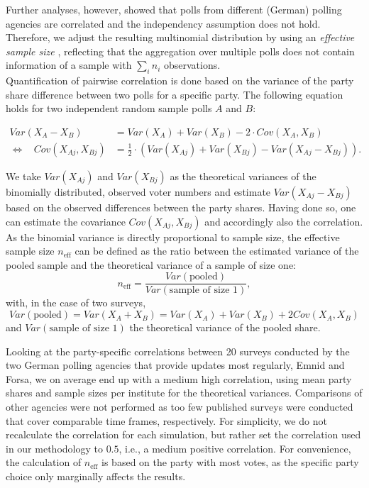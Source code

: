 \documentclass[smallcondensed]{svjour3}     %
\begin{document}
Further analyses, however, showed that polls from different (German)
polling agencies are correlated
and the independency assumption does not hold.
Therefore, we adjust the resulting multinomial
distribution by using an \textit{effective sample size} \citep{hanley_2003},
reflecting that the aggregation over multiple polls does not contain
information of a sample with $\sum_i n_i$ observations.\\

Quantification of pairwise correlation is done based on the variance of the
party share difference between two polls for a specific party.
The following equation holds for two independent
random sample polls $A$ and $B$:

\begin{equation}
\begin{aligned}
Var(X_A - X_B) &= Var(X_A) + Var(X_B) - 2 \cdot Cov(X_A, X_B) \\
\Leftrightarrow \ \ \ \ Cov(X_{Aj}, X_{Bj}) &= \frac{1}{2} \cdot \left(Var(X_{Aj}) + Var(X_{Bj}) - Var(X_{Aj} - X_{Bj}) \right).
\end{aligned}
\end{equation}

We take $Var(X_{Aj})$ and $Var(X_{Bj})$ as the theoretical variances of the binomially distributed, observed voter numbers and estimate $Var(X_{Aj} - X_{Bj})$ based on the observed differences between the party shares. Having done so, one can estimate the covariance $Cov(X_{Aj}, X_{Bj})$ and accordingly also the correlation. As the binomial variance is directly proportional to sample size, the effective sample size $n_{\text{eff}}$ can be defined as the ratio between the estimated variance of the pooled sample and the theoretical variance of a sample of size one:
$$
n_{\text{eff}} = \frac{Var(\text{pooled})}{Var(\text{sample of size 1})},
$$
with, in the case of two surveys,
$$
Var(\text{pooled}) = Var(X_A + X_B) = Var(X_A) + Var(X_B) + 2 Cov(X_A,X_B)
$$
and $Var(\text{sample of size 1})$ the theoretical variance of the pooled share.

Looking at the party-specific correlations between 20 surveys conducted by the
two German polling agencies that provide updates most regularly, Emnid and Forsa,
we on average end up with a medium high correlation, using mean party shares and
sample sizes per institute for the theoretical variances. Comparisons of other
agencies were not performed as too few published surveys were conducted that
cover comparable time frames, respectively. For simplicity, we do not recalculate
the correlation for each simulation, but rather set the correlation used in our
methodology to $0.5$, i.e., a medium positive correlation.
For convenience, the calculation of $n_{\text{eff}}$ is based on the party with
most votes, as the specific party choice only marginally affects the results.\\
\end{document}
